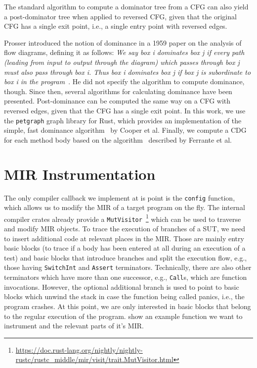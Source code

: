 \documentclass[paper=a4,%
  twoside,%
  BCOR4mm,%
  abstract=true,%
  toc=bibliography,%
  chapterprefix=true,%
  toc=bibliographynumbered,%
  open=right,%
  english,%
  pagesize=pdftex]{scrreprt}
\newcommand{\mir}{\ac{MIR}\xspace}
\newcommand{\cfg}{\ac{CFG}\xspace}
\begin{document}
The standard algorithm to compute a dominator tree from a \cfg can also yield a post-dominator tree when applied to reversed \cfg, given that the original \cfg has a single exit point, i.e., a single entry point with reversed edges.

Prosser introduced the notion of dominance in a 1959 paper on the analysis of flow diagrams, defining it as follows:
\textit{We say box i dominates box j if every path (leading from input to output through the diagram) which passes through box j must also pass through box i. Thus box i dominates box j if box j is subordinate to box i in the program}~\cite{Prosser1959}. He did not specify the algorithm to compute dominance, though. Since then, several algorithms for calculating dominance have been presented. Post-dominance can be computed the same way on a \cfg with reversed edges, given that the \cfg has a single exit point. In this work, we use the \texttt{petgraph} graph library for Rust, which provides an implementation of the simple, fast dominance algorithm~\cite{Cooper2001} by Cooper et al. Finally, we compute a \ac{CDG} for each method body based on the algorithm~\cite{Ferrante1987} described by Ferrante et al.

\section{MIR Instrumentation}
The only compiler callback we implement at is point is the \texttt{config} function, which allows us to modify the \mir of a target program on the fly. The internal compiler crates already provide a \texttt{MutVisitor}~\footnote{\url{https://doc.rust-lang.org/nightly/nightly-rustc/rustc_middle/mir/visit/trait.MutVisitor.html}} which can be used to traverse and modify \mir objects. To trace the execution of branches of a \ac{SUT}, we need to insert additional code at relevant places in the \mir. Those are mainly entry basic blocks (to trace if a body has been entered at all during an execution of a test) and basic blocks that introduce branches and split the execution flow, e.g., those having \texttt{SwitchInt} and \texttt{Assert} terminators. Technically, there are also other terminators which have more than one successor, e.g., \texttt{Call}s, which are function invocations. However, the optional additional branch is used to point to basic blocks which unwind the stack in case the function being called panics, i.e., the program crashes. At this point, we are only interested in basic blocks that belong to the regular execution of the program.  show an example function we want to instrument and the relevant parts of it's \mir.
\end{document}

